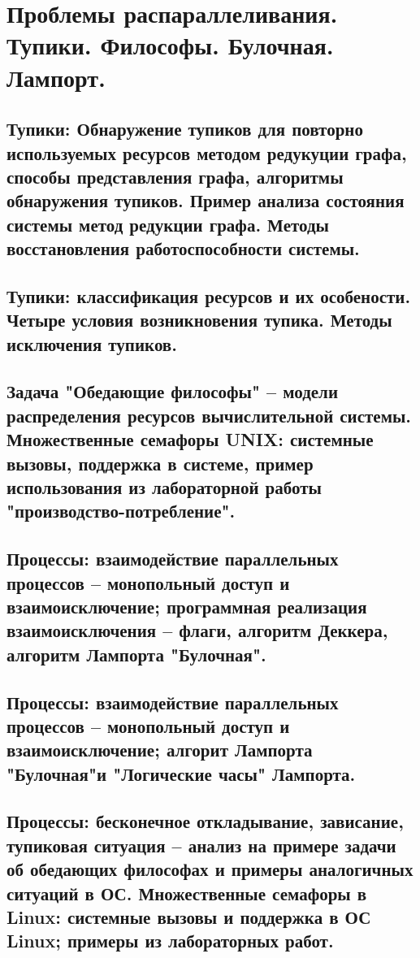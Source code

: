 \section{Проблемы распараллеливания. Тупики. Философы. Булочная. Лампорт.}

\subsection{Тупики: Обнаружение тупиков для повторно используемых ресурсов методом редукуции графа, способы представления графа, алгоритмы обнаружения тупиков. Пример анализа состояния системы метод редукции графа. Методы восстановления работоспособности системы.}

\newpage

\subsection{Тупики: классификация ресурсов и их особености. Четыре условия возникновения тупика. Методы исключения тупиков.}

\newpage

\subsection{Задача "Обедающие философы" – модели распределения ресурсов вычислительной системы. Множественные семафоры UNIX: системные вызовы, поддержка в системе, пример использования из лабораторной работы "производство-потребление".}

\newpage

\subsection{Процессы: взаимодействие параллельных процессов – монопольный доступ и взаимоисключение; программная реализация взаимоисключения – флаги, алгоритм Деккера, алгоритм Лампорта "Булочная".}

\newpage

\subsection{Процессы: взаимодействие параллельных процессов – монопольный доступ и взаимоисключение; алгорит Лампорта "Булочная"и "Логические часы" Лампорта.}

\newpage

\subsection{Процессы: бесконечное откладывание, зависание, тупиковая ситуация – анализ на примере задачи об обедающих философах и примеры аналогичных ситуаций в ОС. Множественные семафоры в Linux: системные вызовы и поддержка в ОС Linux; примеры из лабораторных работ.}

